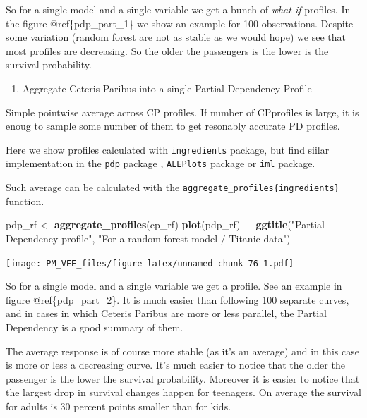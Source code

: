 \documentclass[12pt,]{krantz}
\newenvironment{Shaded}{\begin{snugshade}}{\end{snugshade}}
\newcommand{\KeywordTok}[1]{\textcolor[rgb]{0.13,0.29,0.53}{\textbf{#1}}}
\newcommand{\NormalTok}[1]{#1}
\newcommand{\OperatorTok}[1]{\textcolor[rgb]{0.81,0.36,0.00}{\textbf{#1}}}
\newcommand{\StringTok}[1]{\textcolor[rgb]{0.31,0.60,0.02}{#1}}
\providecommand{\tightlist}{%
  \setlength{\itemsep}{0pt}\setlength{\parskip}{0pt}}
\theoremstyle{definition}
\theoremstyle{definition}
\theoremstyle{definition}
\theoremstyle{remark}
\begin{document}
So for a single model and a single variable we get a bunch of
\emph{what-if} profiles. In the figure @ref\{pdp\_part\_1\} we show an
example for 100 observations. Despite some variation (random forest are
not as stable as we would hope) we see that most profiles are
decreasing. So the older the passengers is the lower is the survival
probability.

\begin{enumerate}
\def\labelenumi{\arabic{enumi}.}
\setcounter{enumi}{1}
\tightlist
\item
  Aggregate Ceteris Paribus into a single Partial Dependency Profile
\end{enumerate}

Simple pointwise average across CP profiles. If number of CPprofiles is
large, it is enoug to sample some number of them to get resonably
accurate PD profiles.

Here we show profiles calculated with \texttt{ingredients} package, but
find siilar implementation in the \texttt{pdp} package \citep{pdp},
\texttt{ALEPlots} package \citep{R-ALEPlot} or \texttt{iml} \citep{iml}
package.

Such average can be calculated with the
\texttt{aggregate\_profiles\{ingredients\}} function.

\begin{Shaded}
\begin{Highlighting}[]
\NormalTok{pdp_rf <-}\StringTok{ }\KeywordTok{aggregate_profiles}\NormalTok{(cp_rf)}
\KeywordTok{plot}\NormalTok{(pdp_rf) }\OperatorTok{+}
\StringTok{  }\KeywordTok{ggtitle}\NormalTok{(}\StringTok{"Partial Dependency profile"}\NormalTok{, }\StringTok{"For a random forest model / Titanic data"}\NormalTok{) }
\end{Highlighting}
\end{Shaded}

\texttt{[image: PM\_VEE\_files/figure-latex/unnamed-chunk-76-1.pdf]}

So for a single model and a single variable we get a profile. See an
example in figure @ref\{pdp\_part\_2\}. It is much easier than following
100 separate curves, and in cases in which Ceteris Paribus are more or
less parallel, the Partial Dependency is a good summary of them.

The average response is of course more stable (as it's an average) and
in this case is more or less a decreasing curve. It's much easier to
notice that the older the passenger is the lower the survival
probability. Moreover it is easier to notice that the largest drop in
survival changes happen for teenagers. On average the survival for
adults is 30 percent points smaller than for kids.
\end{document}
